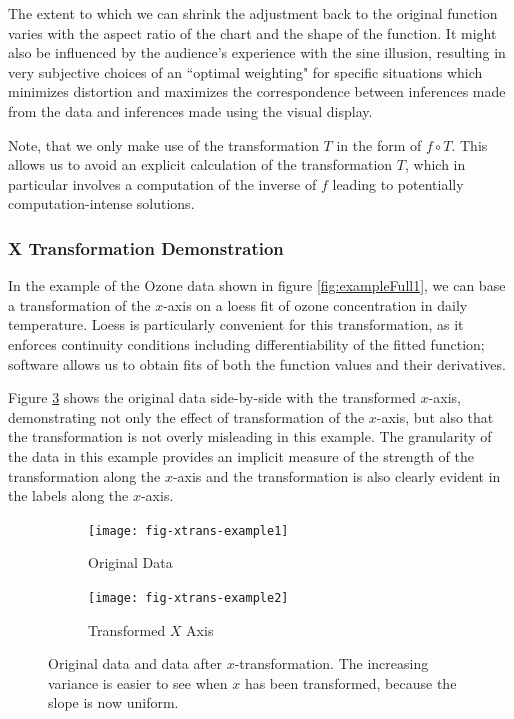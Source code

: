 \documentclass[11pt]{isuthesis}\usepackage[]{graphicx}\usepackage[]{color}
\begin{document}
The extent  to which we can shrink the adjustment back to the original function  varies with the aspect ratio of the chart and the shape of the function. It might also be influenced by the audience's experience with the sine illusion, resulting in very subjective choices of an ``optimal weighting" for specific situations which minimizes distortion and maximizes the correspondence between inferences made from the data and inferences made using the visual display.


Note, that we only make use of the transformation $T$ in the form of $f \circ T$. This allows us to avoid an explicit calculation of the transformation $T$, which in particular  involves a computation of the inverse of $f$ leading to potentially computation-intense solutions. 
\subsubsection{X Transformation Demonstration}


In the example of the Ozone data shown in figure \ref{fig:exampleFull1}, we can base a transformation of the $x$-axis on a loess fit of ozone concentration in daily temperature. Loess is particularly convenient for this transformation, as it enforces continuity conditions including differentiability of the fitted function; software allows us to obtain fits of both the function values and their derivatives.

Figure \ref{fig:xtrans-example} shows the original data side-by-side with the transformed $x$-axis, demonstrating not only the effect of transformation of the $x$-axis, but also that the transformation is not overly misleading in this example. The granularity of the data in this example provides an implicit measure of the strength of the transformation along the $x$-axis and the transformation is also clearly evident in the labels along the $x$-axis. 
%
\begin{figure}[h!]\centering
\begin{subfigure}[b]{.48\linewidth}\centering
\texttt{[image: fig-xtrans-example1]}
\caption{Original Data}\label{fig:xtrans-example-original}
\end{subfigure}
\begin{subfigure}[b]{.48\linewidth}\centering
\texttt{[image: fig-xtrans-example2]}
\caption{Transformed $X$ Axis}\label{fig:xtrans-example-trans}
\end{subfigure}
\caption[Original data and data after X transformation]{Original data and data after $x$-transformation. The increasing variance is easier to see when $x$ has been transformed, because the slope is now uniform.\label{fig:xtrans-example}}
\end{figure}
\end{document}
